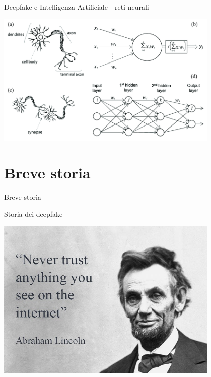 \documentclass[11pt]{beamer}
\begin{document}
\begin{frame}{Deepfake e Intelligenza Artificiale - reti neurali \cite{NN}}

\begin{center}
\includegraphics[width=0.8\textwidth]{Pic/Neural_network.png}
\end{center}

\end{frame}



\section{Breve storia}

\begin{frame}
\begin{center}
\Huge
Breve storia
\end{center}
\end{frame}

\begin{frame}{Storia dei deepfake }

\begin{center}
\includegraphics[width=0.8\textwidth]{Pic/lincon.jpg}
\end{center}

\end{frame}
\end{document}
